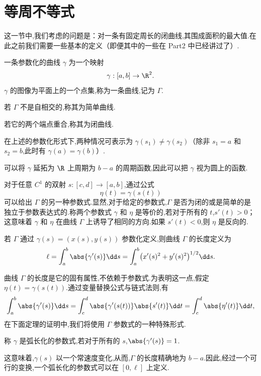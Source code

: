 \section{等周不等式}

这一节中,我们考虑的问题是：对一条有固定周长的闭曲线,其围成面积的最大值.在此之前我们需要一些基本的定义（即便其中的一些在 Part2 中已经讲过了）.

\begin{definition}
	一条参数化的曲线 $\gamma$ 为一个映射
\[
\gamma:[a,b]\to\R^2.
\]
$\gamma$ 的图像为平面上的一个点集,称为一条曲线,记为 $\Gamma$.

若 $\Gamma$ 不是自相交的,称其为简单曲线.

若它的两个端点重合,称其为闭曲线.

在上述的参数化形式下,两种情况可表示为 $\gamma(s_1)\neq\gamma(s_2)$（除非 $s_1=a$ 和 $s_2=b$,此时有 $\gamma(a)=\gamma(b)$）.

\end{definition}
可以将 $\gamma$ 延拓为 $\R$ 上周期为 $b-a$ 的周期函数,因此可以把 $\gamma$ 视为圆上的函数.

对于任意 $C^1$ 的双射 $s:[c,d]\to[a,b]$,通过公式
\[
\eta(t)=\gamma(s(t))
\]
可以给出 $\Gamma$ 的另一种参数式.显然,对于给定的参数式,$\Gamma$ 是否为闭的或是简单的是独立于参数表达式的.称两个参数式 $\gamma$ 和 $\eta$ 是等价的,若对于所有的 $t$,$s'(t)>0$；这意味着 $\gamma$ 和 $\eta$ 在曲线 $\Gamma$ 上诱导了相同的方向.如果 $s'(t)<0$,则 $\eta$ 是反向的.

\begin{definition}
	若 $\Gamma$ 通过 $\gamma(s)=(x(s),y(s))$ 参数化定义,则曲线 $\Gamma$ 的长度定义为
\[
\ell=\int_a^b\abs{\gamma'(s)}\dd s
=\int_a^b\bigl(x'(s)^2+y'(s)^2\bigr)^{1/2}\dd s.
\]
\end{definition}
曲线 $\Gamma$ 的长度是它的固有属性,不依赖于参数式.为表明这一点,假定 $\eta(t)=\gamma(s(t))$.通过变量替换公式与链式法则,有
\[
\int_a^b\abs{\gamma'(s)}\dd s
=\int_c^d\abs{\gamma'(s(t))}\abs{s'(t)}\dd t
=\int_c^d\abs{\eta'(t)}\dd t,
\]
在下面定理的证明中,我们将使用 $\Gamma$ 参数式的一种特殊形式.
\begin{definition}
	称 $\gamma$ 是弧长化的参数式,若对于所有的 $s$,$\abs{\gamma'(s)}=1$.
\end{definition}这意味着,$\gamma(s)$ 以一个常速度变化,从而,$\Gamma$ 的长度精确地为 $b-a$.因此,经过一个可行的变换,一个弧长化的参数式可以在 $[0,\ell]$ 上定义.

